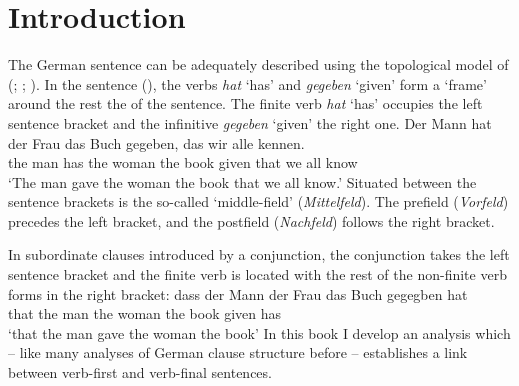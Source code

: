 


\chapter{Introduction}
\label{chapter-introduction}

The German sentence can be adequately described using the topological model of (\citealp*{Reis80a}; \citealp*{Hoehle86}; \citealp{Askedal86}).
In the sentence (), the verbs \emph{hat} `has' and \emph{gegeben} `given' form a `frame'
around the rest the of the sentence. The finite verb \emph{hat} `has' occupies the left sentence bracket and the
infinitive \emph{gegeben} `given' the right one. 
\ea
\gll Der Mann hat der Frau das Buch gegeben, das wir alle kennen.\\
     the man  has the woman the book given   that we all  know\\
\glt `The man gave the woman the book that we all know.'
\z
Situated between the sentence brackets is the so-called `middle-field' (\emph{Mittelfeld}). The prefield (\emph{Vorfeld}) precedes
the left bracket, and the postfield (\emph{Nachfeld}) follows the right bracket. 

In subordinate clauses introduced by a conjunction, the conjunction takes the left sentence bracket
and the finite verb is located with the rest of the non-finite verb forms in the right bracket:
\ea
\label{ex-gegeben-hat}
\gll dass der Mann der Frau das Buch gegegben hat\\
     that the man  the woman the book given has\\
\glt `that the man gave the woman the book'
\z
In this book I develop an analysis which -- like many analyses of German clause structure before -- establishes a link between verb-first and verb-final sentences.



